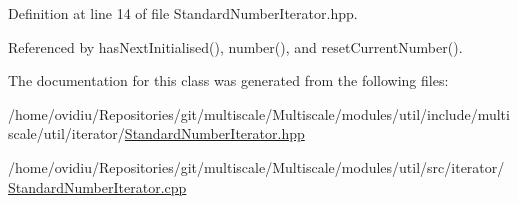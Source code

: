 \-Definition at line 14 of file \-Standard\-Number\-Iterator.\-hpp.



\-Referenced by has\-Next\-Initialised(), number(), and reset\-Current\-Number().



\-The documentation for this class was generated from the following files\-:\begin{DoxyCompactItemize}
\item 
/home/ovidiu/\-Repositories/git/multiscale/\-Multiscale/modules/util/include/multiscale/util/iterator/\hyperlink{StandardNumberIterator_8hpp}{\-Standard\-Number\-Iterator.\-hpp}\item 
/home/ovidiu/\-Repositories/git/multiscale/\-Multiscale/modules/util/src/iterator/\hyperlink{StandardNumberIterator_8cpp}{\-Standard\-Number\-Iterator.\-cpp}\end{DoxyCompactItemize}
